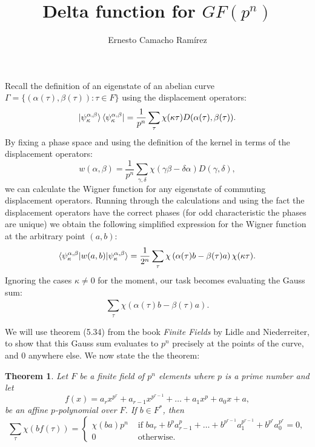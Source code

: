 \documentclass[a4paper]{article}
\title{Delta function for $GF(p^{n})$}
\author{Ernesto Camacho Ramírez}
\newtheorem{theorem}{Theorem}
\begin{document}
  \maketitle

  Recall the definition of an eigenstate of an abelian curve
  $\Gamma = \{(\alpha(\tau),\beta(\tau)) : \tau \in F\}$
  using the displacement operators:
  \begin{equation}
    \ket{\psi_\kappa^{\alpha,\beta}}
    \bra{\psi_\kappa^{\alpha,\beta}}
    = \frac{1}{p^{n}}
    \sum_{\tau}^{} \chi(\kappa\tau) 
    D(\alpha(\tau),\beta(\tau)).
  \end{equation}
  By fixing a phase space and using the definition of the
  kernel in terms of the displacement operators:
  \begin{equation}
    w(\alpha,\beta)
    = \frac{1}{p^{n}} \sum_{\gamma,\delta}^{} 
    \chi(\gamma\beta - \delta\alpha) D(\gamma,\delta),
  \end{equation}
  we can calculate the Wigner function for any eigenstate of
  commuting displacement operators.  Running through the
  calculations and using the fact the displacement operators
  have the correct phases (for odd characteristic the phases
  are unique) we obtain the following simplified expression
  for the Wigner function at the arbitrary point $(a,b)$:
  \begin{equation}
    \braket{
      \psi_{\kappa}^{\alpha,\beta}|w(a,b)|
      \psi_{\kappa}^{\alpha,\beta}
    }
    = \frac{1}{2^{n}}
    \sum_{\tau}^{} 
    \chi\left( \alpha(\tau)b - \beta(\tau)a \right) 
    \chi(\kappa\tau).
  \end{equation}
  Ignoring the cases $\kappa \neq 0$ for the moment, our
  task becomes evaluating the Gauss sum:
  \begin{equation}
    \sum_{\tau}^{} 
    \chi\left( \alpha(\tau)b - \beta(\tau)a \right).
  \end{equation}

  We will use theorem (5.34) from the book
  \textit{Finite Fields} by Lidle and Niederreiter, to show
  that this Gauss sum evaluates to $p^{n}$ precisely at the
  points of the curve, and $0$ anywhere else. We now state
  the the theorem:
  \begin{theorem}
    Let $F$ be a finite field of $p^{n}$ elements where $p$
    is a prime number and let
    \begin{equation}
      f(x)
      = a_r x^{p^{r}} + a_{r-1}x^{p^{r-1}} + \ldots
      + a_1x^{p} + a_0x + a,
    \end{equation}
    be an affine $p$-polynomial over $F$. If $b \in F^{*}$,
    then
    \begin{equation}
      \sum_{\tau}^{} 
      \chi(bf(\tau))
      = \begin{cases}
        \chi(ba) p^{n} & \text{ if } 
        ba_r + b^{p}a_{r-1}^p + \ldots +
        b^{p^{r-1}}a_1^{p^{r-1}} + b^{p^{r}}a_0^{p^{r}} = 0,
        \\
        0 & \text{ otherwise. }
      \end{cases}
    \end{equation}
  \end{theorem}
\end{document}
